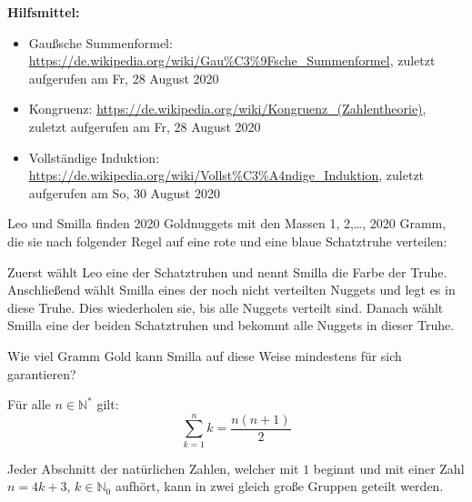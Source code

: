 \documentclass[10pt, a4paper, reqno]{amsart}
\begin{document}
\thispagestyle{Hilfsmittel}
\vspace*{3pt}
\begin{center}
  \large\textbf{Hilfsmittel:}
\end{center}
\vspace*{3pt}
\begin{itemize}
\item Gaußsche Summenformel: \url{https://de.wikipedia.org/wiki/Gau%C3%9Fsche_Summenformel}, zuletzt
  aufgerufen am Fr, 28 August 2020
\item Kongruenz: \url{https://de.wikipedia.org/wiki/Kongruenz_(Zahlentheorie)}, zuletzt
  aufgerufen am Fr, 28 August 2020
\item Vollständige Induktion:
  \url{https://de.wikipedia.org/wiki/Vollst%C3%A4ndige_Induktion}, zuletzt
  aufgerufen am So, 30 August 2020
\end{itemize}
\newpage
\pagestyle{normal}
\begin{aufgabe}
  Leo und Smilla finden 2020 Goldnuggets mit den Massen 1, 2,\ldots, 2020 Gramm,
  die sie nach folgender Regel auf eine rote und eine blaue Schatztruhe
  verteilen:
 
  Zuerst wählt Leo eine der Schatztruhen und nennt Smilla die Farbe der Truhe.
  Anschließend wählt Smilla eines der noch nicht verteilten Nuggets und legt es
  in diese Truhe. Dies wiederholen sie, bis alle Nuggets verteilt sind. Danach
  wählt Smilla eine der beiden Schatztruhen und bekommt alle Nuggets in dieser
  Truhe.

  Wie viel Gramm Gold kann Smilla auf diese Weise mindestens für sich
  garantieren?
\end{aufgabe}
\begin{lemma}\label{sec1:Zahlensumme}
  Für alle $n∈ℕ^*$ gilt:
  \[ \sum^{n}_{k=1}k=\frac{n(n+1)}{2}\]
\end{lemma}
\begin{lemma}
  \label{sec1:zahlengruppen}
  Jeder Abschnitt der natürlichen Zahlen, welcher mit $1$ beginnt und mit einer
  Zahl $n=4k+3$, $k∈ℕ_0$ aufhört, kann in zwei gleich große Gruppen geteilt
  werden.
\end{lemma}
\end{document}
